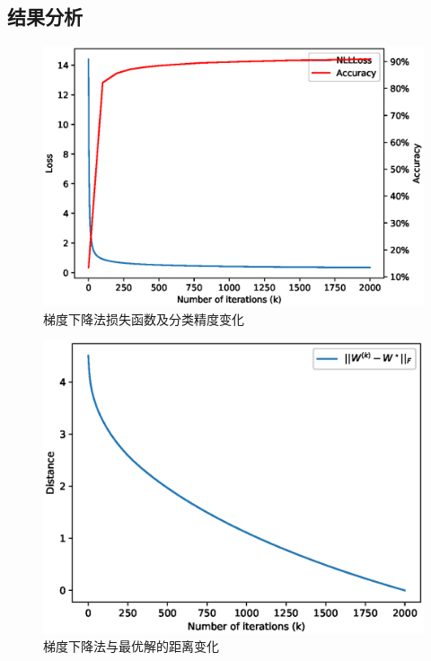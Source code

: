 \documentclass[logo,reportComp]{thesis}
\begin{document}
\subsection{结果分析}
\begin{minipage}{0.5\linewidth}
\begin{figure}[H]
\centering
\includegraphics[width=\linewidth]{fig/p2-acc.eps}
\caption{梯度下降法损失函数及分类精度变化}
\label{fig:p2-acc-gd}
\end{figure}
\end{minipage}
\begin{minipage}{0.5\linewidth}
\begin{figure}[H]
\centering
\includegraphics[width=0.98\linewidth]{fig/p2-opt-dist.eps}
\caption{梯度下降法与最优解的距离变化}
\label{fig:p2-opt-dist-gd}
\end{figure}
\end{minipage}
\end{document}
